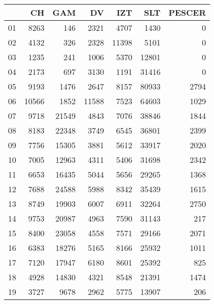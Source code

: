 \begin{table}[ht]
\centering
\begin{tabular}{rrrrrrr}
  \hline
 & CH & GAM & DV & IZT & SLT & PESCER \\ 
  \hline
01 & 8263 & 146 & 2321 & 4707 & 1430 &   0 \\ 
  02 & 4132 & 326 & 2328 & 11398 & 5101 &   0 \\ 
  03 & 1235 & 241 & 1006 & 5370 & 12801 &   0 \\ 
  04 & 2173 & 697 & 3130 & 1191 & 31416 &   0 \\ 
  05 & 9193 & 1476 & 2647 & 8157 & 80933 & 2794 \\ 
  06 & 10566 & 1852 & 11588 & 7523 & 64603 & 1029 \\ 
  07 & 9718 & 21549 & 4843 & 7076 & 38846 & 1844 \\ 
  08 & 8183 & 22348 & 3749 & 6545 & 36801 & 2399 \\ 
  09 & 7756 & 15305 & 3881 & 5612 & 33917 & 2020 \\ 
  10 & 7005 & 12963 & 4311 & 5406 & 31698 & 2342 \\ 
  11 & 6653 & 16435 & 5044 & 5656 & 29265 & 1368 \\ 
  12 & 7688 & 24588 & 5988 & 8342 & 35439 & 1615 \\ 
  13 & 8749 & 19903 & 6007 & 6911 & 32264 & 2750 \\ 
  14 & 9753 & 20987 & 4963 & 7590 & 31143 & 217 \\ 
  15 & 8400 & 23058 & 4558 & 7571 & 29166 & 2071 \\ 
  16 & 6383 & 18276 & 5165 & 8166 & 25932 & 1011 \\ 
  17 & 7120 & 17947 & 6180 & 8601 & 25392 & 825 \\ 
  18 & 4928 & 14830 & 4321 & 8548 & 21391 & 1474 \\ 
  19 & 3727 & 9678 & 2962 & 5775 & 13907 & 206 \\ 
   \hline
\end{tabular}
\end{table}
